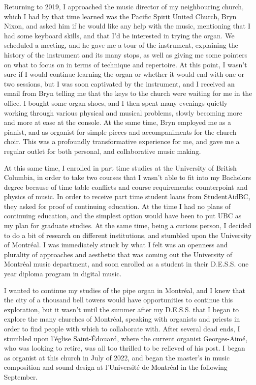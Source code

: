 \documentclass[12pt,twoside,maitrise]{dms}
\theoremstyle{definition}
\begin{document}
Returning to 2019, I approached the music director of my neighbouring church, which I had by that time learned was the Pacific Spirit United Church, Bryn Nixon, and asked him if he would like any help with the music, mentioning that I had some keyboard skills, and that I’d be interested in trying the organ.
We scheduled a meeting, and he gave me a tour of the instrument, explaining the history of the instrument and its many stops, as well as giving me some pointers on what to focus on in terms of technique and repertoire.
At this point, I wasn’t sure if I would continue learning the organ or whether it would end with one or two sessions, but I was soon captivated by the instrument, and I received an email from Bryn telling me that the keys to the church were waiting for me in the office.
I bought some organ shoes, and I then spent many evenings quietly working through various physical and musical problems, slowly becoming more and more at ease at the console.
At the same time, Bryn employed me as a pianist, and as organist for simple pieces and accompaniments for the church choir.
This was a profoundly transformative experience for me, and gave me a regular outlet for both personal, and collaborative music making.

At this same time, I enrolled in part time studies at the University of British Columbia, in order to take two courses that I wasn’t able to fit into my Bachelors degree because of time table conflicts and course requirements: counterpoint and physics of music.
In order to receive part time student loans from StudentAidBC, they asked for proof of continuing education.
At the time I had no plans of continuing education, and the simplest option would have been to put UBC as my plan for graduate studies.
At the same time, being a curious person, I decided to do a bit of research on different institutions, and stumbled upon the University of Montréal.
I was immediately struck by what I felt was an openness and plurality of approaches and aesthetic that was coming out the University of Montréal music department, and soon enrolled as a student in their D.E.S.S.
one year diploma program in digital music.

I wanted to continue my studies of the pipe organ in Montréal, and I knew that the city of a thousand bell towers would have opportunities to continue this exploration, but it wasn’t until the summer after my D.E.S.S.
that I began to explore the many churches of Montréal, speaking with organists and priests in order to find people with which to collaborate with.
After several dead ends, I stumbled upon l’église Saint-Édouard, where the current organist Georges-Aimé, who was looking to retire, was all too thrilled to be relieved of his post.
I began as organist at this church in July of 2022, and began the master’s in music composition and sound design at l’Université de Montréal in the following September.
\end{document}
